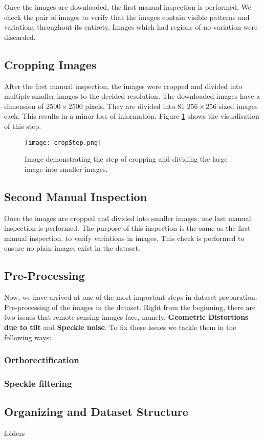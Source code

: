 Once the images are downloaded, the first manual inspection is performed. We check the pair of images to verify that the images contain visible patterns and variations throughout its entirety. Images which had regions of no variation were discarded.

\subsection{Cropping Images}

After the first manual inspection, the images were cropped and divided into multiple smaller images to the decided resolution. The downloaded images have a dimension of $2500\times2500$ pixels. They are divided into 81 $256\times256$ sized images each. This results in a minor loss of information. Figure \ref{fig:cropStep} shows the visualisation of this step.

\begin{figure}[h]
    \texttt{[image: cropStep.png]}
    \caption{Image demonstrating the step of cropping and dividing the large image into smaller images.}
    \label{fig:cropStep}
\end{figure}

\subsection{Second Manual Inspection}

Once the images are cropped and divided into smaller images, one last manual inspection is performed. The purpose of this inspection is the same as the first manual inspection, to verify variations in images. This check is performed to ensure no plain images exist in the dataset.

\subsection{Pre-Processing}

Now, we have arrived at one of the most important steps in dataset preparation. Pre-processing of the images in the dataset. Right from the beginning, there are two issues that remote sensing images face, namely, \textbf{Geometric Distortions due to tilt} and \textbf{Speckle noise}. To fix these issues we tackle them in the following ways:

\subsubsection{Orthorectification}

\subsubsection{Speckle filtering}

\subsection{Organizing and Dataset Structure}

folders